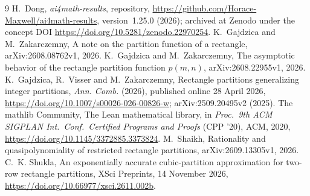 \documentclass[11pt]{article}
\theoremstyle{definition}
\theoremstyle{remark}
\newcommand{\repoversion}{1.25.0}
\begin{document}
{\small
\begin{thebibliography}{9}
\setlength{\itemsep}{1pt}
 H.~Dong, \emph{ai4math-results}, repository,
\url{https://github.com/Horace-Maxwell/ai4math-results}, version~\repoversion{}
(2026); archived at Zenodo under the concept DOI
\url{https://doi.org/10.5281/zenodo.22970254}.
 K.~Gajdzica and M.~Zakarczemny, A note on the partition
function of a rectangle, arXiv:2608.08762v1, 2026.
 K.~Gajdzica and M.~Zakarczemny, The asymptotic behavior of the
rectangle partition function $p(m,n)$, arXiv:2608.22955v1, 2026.
 K.~Gajdzica, R.~Visser and M.~Zakarczemny, Rectangle
partitions generalizing integer partitions, \emph{Ann. Comb.} (2026),
published online 28 April 2026,
\url{https://doi.org/10.1007/s00026-026-00826-w}; arXiv:2509.20495v2 (2025).
The mathlib Community, The Lean mathematical library, in \emph{Proc.\ 9th ACM
SIGPLAN Int.\ Conf.\ Certified Programs and Proofs} (CPP '20), ACM, 2020,
\url{https://doi.org/10.1145/3372885.3373824}.
 M.~Shaikh, Rationality and quasipolynomiality of restricted
rectangle partitions, arXiv:2609.13305v1, 2026.
 C.~K. Shukla, An exponentially accurate cubic-partition
approximation for two-row rectangle partitions, XSci Preprints, 14 November
2026, \url{https://doi.org/10.66977/xsci.2611.002b}.
\end{thebibliography}}
\end{document}
